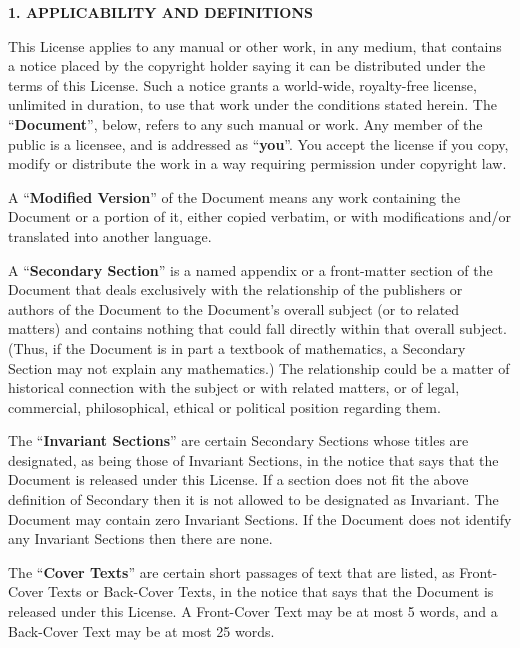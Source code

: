 \begin{scriptsize}
\begin{multicols}{2}
    \begin{center}
      {\bf 1. APPLICABILITY AND DEFINITIONS\par}
    \end{center}

    This License applies to any manual or other work, in any medium, that contains a notice placed by the copyright holder saying it can be distributed under the terms of this License.  Such a notice grants a world-wide, royalty-free license, unlimited in duration, to use that work under the conditions stated herein.  The ``\textbf{Document}'', below, refers to any such manual or work.  Any member of the public is a licensee, and is addressed as ``\textbf{you}''.  You accept the license if you copy, modify or distribute the work in a way requiring permission under copyright law.

    A ``\textbf{Modified Version}'' of the Document means any work containing the Document or a portion of it, either copied verbatim, or with modifications and/or translated into another language.

    A ``\textbf{Secondary Section}'' is a named appendix or a front-matter section of the Document that deals exclusively with the relationship of the publishers or authors of the Document to the Document's overall subject (or to related matters) and contains nothing that could fall directly within that overall subject. (Thus, if the Document is in part a textbook of mathematics, a Secondary Section may not explain any mathematics.) The relationship could be a matter of historical connection with the subject or with related matters, or of legal, commercial, philosophical, ethical or political position regarding them.

    The ``\textbf{Invariant Sections}'' are certain Secondary Sections whose titles are designated, as being those of Invariant Sections, in the notice that says that the Document is released under this License.  If a section does not fit the above definition of Secondary then it is not allowed to be designated as Invariant. The Document may contain zero Invariant Sections.  If the Document does not identify any Invariant Sections then there are none.

    The ``\textbf{Cover Texts}'' are certain short passages of text that are listed, as Front-Cover Texts or Back-Cover Texts, in the notice that says that the Document is released under this License.  A Front-Cover Text may be at most 5 words, and a Back-Cover Text may be at most 25 words.


\end{multicols}
\end{scriptsize}
